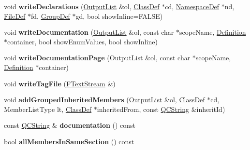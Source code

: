 \begin{DoxyCompactItemize}
\item 
\mbox{\label{class_member_group_af5b7e6ea9ecd6ad33aa40e863fb9e809}} 
void {\bfseries write\+Declarations} (\mbox{\hyperlink{class_output_list}{Output\+List}} \&ol, \mbox{\hyperlink{class_class_def}{Class\+Def}} $\ast$cd, \mbox{\hyperlink{class_namespace_def}{Namespace\+Def}} $\ast$nd, \mbox{\hyperlink{class_file_def}{File\+Def}} $\ast$fd, \mbox{\hyperlink{class_group_def}{Group\+Def}} $\ast$gd, bool show\+Inline=F\+A\+L\+SE)
\item 
\mbox{\label{class_member_group_a7410bdf400070581fae0d9b0846fe3a2}} 
void {\bfseries write\+Documentation} (\mbox{\hyperlink{class_output_list}{Output\+List}} \&ol, const char $\ast$scope\+Name, \mbox{\hyperlink{class_definition}{Definition}} $\ast$container, bool show\+Enum\+Values, bool show\+Inline)
\item 
\mbox{\label{class_member_group_a16fd2d2ddba7e35f4e0ed5bab6172d57}} 
void {\bfseries write\+Documentation\+Page} (\mbox{\hyperlink{class_output_list}{Output\+List}} \&ol, const char $\ast$scope\+Name, \mbox{\hyperlink{class_definition}{Definition}} $\ast$container)
\item 
\mbox{\label{class_member_group_adb184ead64edfd054cb47c15e4a5b89e}} 
void {\bfseries write\+Tag\+File} (\mbox{\hyperlink{class_f_text_stream}{F\+Text\+Stream}} \&)
\item 
\mbox{\label{class_member_group_aa9798fce83c8c660e4413dc7f12a41fa}} 
void {\bfseries add\+Grouped\+Inherited\+Members} (\mbox{\hyperlink{class_output_list}{Output\+List}} \&ol, \mbox{\hyperlink{class_class_def}{Class\+Def}} $\ast$cd, Member\+List\+Type lt, \mbox{\hyperlink{class_class_def}{Class\+Def}} $\ast$inherited\+From, const \mbox{\hyperlink{class_q_c_string}{Q\+C\+String}} \&inherit\+Id)
\item 
\mbox{\label{class_member_group_a8451fb15074bf50952dc1bfb4902d173}} 
const \mbox{\hyperlink{class_q_c_string}{Q\+C\+String}} \& {\bfseries documentation} () const
\item 
\mbox{\label{class_member_group_a5e54a4524c532b3893ea2f810fbdbeb5}} 
bool {\bfseries all\+Members\+In\+Same\+Section} () const

\end{DoxyCompactItemize}
